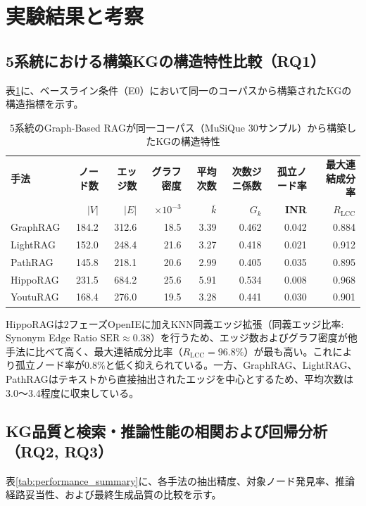 \documentclass[a4j,dvipdfmx]{jsarticle}
\begin{document}
\section{実験結果と考察}

\subsection{5系統における構築KGの構造特性比較（RQ1）}
表\ref{tab:kg_structure}に、ベースライン条件（E0）において同一のコーパスから構築されたKGの構造指標を示す。

\begin{table}[t]
\centering
\caption{5系統のGraph-Based RAGが同一コーパス（MuSiQue 30サンプル）から構築したKGの構造特性}
\label{tab:kg_structure}
\small
\begin{tabular}{l|rrrrrrr}
\textbf{手法} & \textbf{ノード数} & \textbf{エッジ数} & \textbf{グラフ密度} & \textbf{平均次数} & \textbf{次数ジニ係数} & \textbf{孤立ノード率} & \textbf{最大連結成分率} \\
 & \textbf{$|V|$} & \textbf{$|E|$} & \textbf{$\times 10^{-3}$} & \textbf{$\bar{k}$} & \textbf{$G_k$} & \textbf{INR} & \textbf{$R_{\text{LCC}}$} \\
\hline
GraphRAG & 184.2 & 312.6 & 18.5 & 3.39 & 0.462 & 0.042 & 0.884 \\
LightRAG & 152.0 & 248.4 & 21.6 & 3.27 & 0.418 & 0.021 & 0.912 \\
PathRAG  & 145.8 & 218.1 & 20.6 & 2.99 & 0.405 & 0.035 & 0.895 \\
HippoRAG & 231.5 & 684.2 & 25.6 & 5.91 & 0.534 & 0.008 & 0.968 \\
YoutuRAG & 168.4 & 276.0 & 19.5 & 3.28 & 0.441 & 0.030 & 0.901 \\
\end{tabular}
\end{table}

HippoRAGは2フェーズOpenIEに加えKNN同義エッジ拡張（同義エッジ比率: Synonym Edge Ratio $\text{SER} \approx 0.38$）を行うため、エッジ数およびグラフ密度が他手法に比べて高く、最大連結成分比率（$R_{\text{LCC}} = 96.8\%$）が最も高い。これにより孤立ノード率が0.8\%と低く抑えられている。一方、GraphRAG、LightRAG、PathRAGはテキストから直接抽出されたエッジを中心とするため、平均次数は3.0〜3.4程度に収束している。

\subsection{KG品質と検索・推論性能の相関および回帰分析（RQ2, RQ3）}
表\ref{tab:performance_summary}に、各手法の抽出精度、対象ノード発見率、推論経路妥当性、および最終生成品質の比較を示す。
\end{document}
